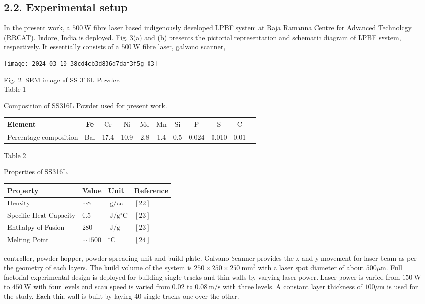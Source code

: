 \documentclass[10pt]{article}
\begin{document}
\subsection*{2.2. Experimental setup}
In the present work, a $500 \mathrm{~W}$ fibre laser based indigenously developed LPBF system at Raja Ramanna Centre for Advanced Technology (RRCAT), Indore, India is deployed. Fig. 3(a) and (b) presents the pictorial representation and schematic diagram of LPBF system, respectively. It essentially consists of a $500 \mathrm{~W}$ fibre laser, galvano scanner,

\begin{center}
\texttt{[image: 2024\_03\_10\_38cd4cb3d836d7daf3f5g-03]}
\end{center}

Fig. 2. SEM image of SS 316L Powder.\\
Table 1

Composition of SS316L Powder used for present work.

\begin{center}
\begin{tabular}{lcccccccccl}
\hline
Element & Fe & $\mathrm{Cr}$ & $\mathrm{Ni}$ & $\mathrm{Mo}$ & $\mathrm{Mn}$ & $\mathrm{Si}$ & $\mathrm{P}$ & $\mathrm{S}$ & $\mathrm{C}$ \\
\hline
Percentage composition & Bal & 17.4 & 10.9 & 2.8 & 1.4 & 0.5 & 0.024 & 0.010 & 0.01 \\
\hline
\end{tabular}
\end{center}

Table 2

Properties of SS316L.

\begin{center}
\begin{tabular}{llll}
\hline
Property & Value & Unit & Reference \\
\hline
Density & $\sim 8$ & $\mathrm{~g} / \mathrm{cc}$ & $[22]$ \\
Specific Heat Capacity & 0.5 & $\mathrm{~J} / \mathrm{g}{ }^{\circ} \mathrm{C}$ & $[23]$ \\
Enthalpy of Fusion & 280 & $\mathrm{~J} / \mathrm{g}$ & $[23]$ \\
Melting Point & $\sim 1500$ & ${ }^{\circ} \mathrm{C}$ & $[24]$ \\
\hline
\end{tabular}
\end{center}

controller, powder hopper, powder spreading unit and build plate. Galvano-Scanner provides the $\mathrm{x}$ and $\mathrm{y}$ movement for laser beam as per the geometry of each layers. The build volume of the system is $250 \times 250 \times 250 \mathrm{~mm}^{3}$ with a laser spot diameter of about $500 \mu \mathrm{m}$. Full factorial experimental design is deployed for building single tracks and thin walls by varying laser power. Laser power is varied from $150 \mathrm{~W}$ to $450 \mathrm{~W}$ with four levels and scan speed is varied from 0.02 to $0.08 \mathrm{~m} / \mathrm{s}$ with three levels. A constant layer thickness of $100 \mu \mathrm{m}$ is used for the study. Each thin wall is built by laying 40 single tracks one over the other.
\end{document}
